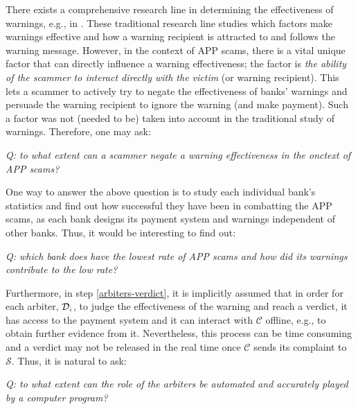There exists  a comprehensive research line in determining the effectiveness of warnings, e.g., in \cite{laughery2006designing,brinton2016users,felt2014experimenting}. These traditional research line  studies which factors make warnings effective and how a warning recipient is attracted to and follows the warning message.  However, in the context of APP scams, there is a vital  unique factor  that can directly influence a warning effectiveness; the factor is    \emph{the ability of the scammer to interact directly with the victim} (or warning recipient). This lets a scammer to actively try to negate  the effectiveness of banks' warnings and persuade the warning recipient to ignore the warning (and make  payment). Such a factor was not (needed to be) taken into account in the traditional study of warnings. Therefore, one may ask: 

  \begin{center}\textit{Q: to what extent can a scammer  negate a warning effectiveness in the onctext of APP scams?}
  \end{center}


One way to answer the above question is to study each individual bank's statistics and find out how successful they have been in combatting the APP scams, as each bank designs its payment system and warnings independent of other banks. Thus, it would be interesting to find out:
  \begin{center}\textit{Q: which bank  does have  the  lowest rate of APP scams and how did its warnings contribute to the low rate?}  
  \end{center}


Furthermore, in step \ref{arbiters-verdict}, it is implicitly assumed that in order for each arbiter, $\mathcal{D}_{\scriptscriptstyle i}$, to judge  the effectiveness of the warning and reach a verdict, it has access to the payment system and it can interact  with  $\mathcal{C}$ offline, e.g., to obtain further evidence from it.  Nevertheless, this process can be time consuming and a verdict may not be released in the real time once $\mathcal{C}$ sends its complaint to $\mathcal{S}$. Thus, it is natural to ask: 

\begin{center}\textit{Q: to what extent can the role of the arbiters  be automated and accurately played by a computer program?}
\end{center}

